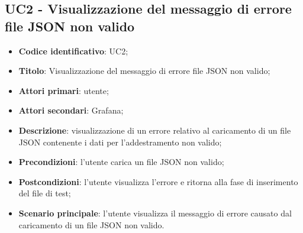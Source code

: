 \subsection{UC2 - Visualizzazione del messaggio di errore file JSON non valido}
\begin{itemize}
	\item \textbf{Codice identificativo}: UC2;
	\item \textbf{Titolo}: Visualizzazione del messaggio di errore file JSON non valido;
	\item \textbf{Attori primari}: utente;
	\item \textbf{Attori secondari}: Grafana\glo;
	\item \textbf{Descrizione}: visualizzazione di un errore relativo al caricamento di un file JSON contenente i dati per l'addestramento non valido;
	\item \textbf{Precondizioni}: l'utente carica un file JSON non valido;
	\item \textbf{Postcondizioni}: l'utente visualizza l'errore e ritorna alla fase di inserimento del file di test;	
	\item \textbf{Scenario principale}: l'utente visualizza il messaggio di errore causato dal caricamento di un file JSON non valido.	
\end{itemize}
